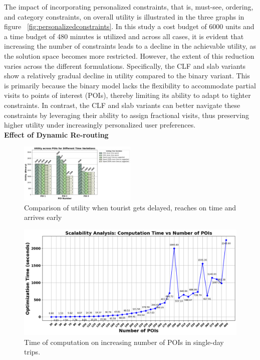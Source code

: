 The impact of incorporating personalized constraints, that is, must-see, ordering, and category constraints, on overall utility is illustrated in the three graphs in figure ~\ref{fig:personalizedconstraints}. In this study a cost budget of 6000 units and a time budget of 480 minutes is utilized and across all cases, it is evident that increasing the number of constraints leads to a decline in the achievable utility, as the solution space becomes more restricted. However, the extent of this reduction varies across the different formulations. Specifically, the CLF and slab variants show a relatively gradual decline in utility compared to the binary variant. This is primarily because the binary model lacks the flexibility to accommodate partial visits to points of interest (POIs), thereby limiting its ability to adapt to tighter constraints. In contrast, the CLF and slab variants can better navigate these constraints by leveraging their ability to assign fractional visits, thus preserving higher utility under increasingly personalized user preferences.\\

\noindent\textbf{Effect of Dynamic Re-routing}
\begin{figure}[H]
    \centering
    \includegraphics[width=0.50\textwidth]{plots/dynamic_pkj.png}
    \caption{Comparison of utility when tourist gets delayed, reaches on time and arrives early}
    \label{fig:dynamic}
\end{figure}

\begin{figure}[htbp]
    \centering
    \includegraphics[width=\textwidth]{plots/scalability_pkj.png}
    \caption{Time of computation on increasing number of POIs in single-day trips.}
    \label{fig:scalability1}
\end{figure}

